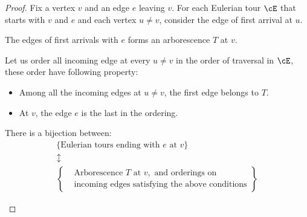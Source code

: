 \begin{proof}
	Fix a vertex \( v \) and an edge \( e \) leaving \( v \). For each Eulerian tour \( \cE \) that
	starts with \( v \) and \( e \) and
	each vertex \( u\ne v \), consider the edge of first arrival at \( u \).
	\begin{claim}
		The edges of first arrivals with \( e \) forms an arborescence \( T \) at \( v \).
	\end{claim}
	Let us order all incoming edge at every \( u\ne v \) in the order of traversal in \( \cE \), these
	order have following property:
	\begin{itemize}
		\item Among all the incoming edges at \( u\ne v \), the first edge belongs to \( T \).
		\item At \( v \), the edge \( e \) is the last in the ordering.
	\end{itemize}

	\begin{lemma}
		There is a bijection between:
		$$
			\begin{gathered}
				\{\text{Eulerian tours ending with } e \text{ at } v\} \\
				\updownarrow \\
				\left\{
				\begin{aligned}
					 & \text{Arborescence } T \text{ at } v, \text{ and orderings on} \\
					 & \text{incoming edges satisfying the above conditions}
				\end{aligned}
				\right\}
			\end{gathered}
		$$
	\end{lemma}


\end{proof}
